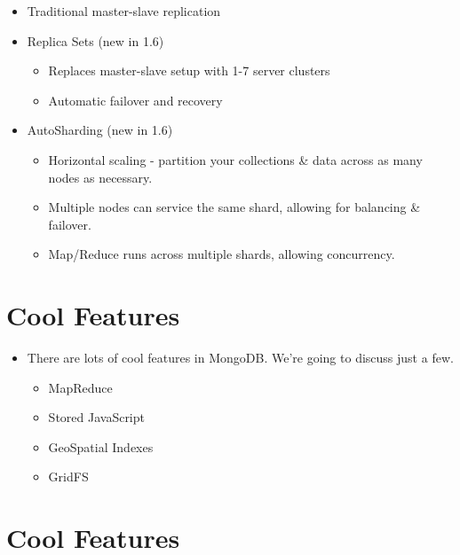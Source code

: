 \documentclass[xcolor=dvipsnames]{beamer}
\newenvironment{itemizeframe}
               {\begin{frame}\startitemizeframe} 
               {\stopitemizeframe\end{frame}}
\newcommand\startitemizeframe{\begin{itemize}} \newcommand\stopitemizeframe{\end{itemize}}
\begin{document}
\begin{itemizeframe}
\frametitle{Finally, Data Scalability.}
\item Traditional master-slave replication
\item Replica Sets (new in 1.6)
    \begin{itemize}
        \item Replaces master-slave setup with 1-7 server clusters
        \item Automatic failover and recovery
    \end{itemize}
\item AutoSharding (new in 1.6)
    \begin{itemize}
        \item Horizontal scaling - partition your collections \& data across as many nodes as necessary.
        \item Multiple nodes can service the same shard, allowing for balancing \& failover.
        \item Map/Reduce runs across multiple shards, allowing concurrency.
    \end{itemize}
\end{itemizeframe}
\section{Cool Features}

\begin{itemizeframe}
        \frametitle{Cool Features?}
        \item There are lots of cool features in MongoDB.  We're going to discuss just a few.
            \begin{itemize}
                \item MapReduce
                \item Stored JavaScript 
                \item GeoSpatial Indexes
                \item GridFS
            \end{itemize}
\end{itemizeframe}

\section{Cool Features}
\end{document}
